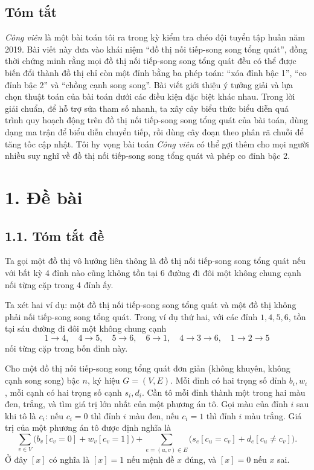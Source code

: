 \documentclass[11pt]{article}
\begin{document}
\subsection*{Tóm tắt}

\emph{Công viên} là một bài toán tôi ra trong kỳ kiểm tra chéo đội tuyển tập
huấn năm 2019. Bài viết này đưa vào khái niệm ``đồ thị nối tiếp-song song
tổng quát'', đồng thời chứng minh rằng mọi đồ thị nối tiếp-song song tổng
quát đều có thể được biến đổi thành đồ thị chỉ còn một đỉnh bằng ba phép toán:
``xóa đỉnh bậc 1'', ``co đỉnh bậc 2'' và ``chồng cạnh song song''. Bài viết
giới thiệu ý tưởng giải và lựa chọn thuật toán của bài toán dưới các điều
kiện đặc biệt khác nhau. Trong lời giải chuẩn, để hỗ trợ sửa tham số nhanh,
ta xây cây biểu thức biểu diễn quá trình quy hoạch động trên đồ thị nối
tiếp-song song tổng quát của bài toán, dùng dạng ma trận để biểu diễn chuyển
tiếp, rồi dùng cây đoạn theo phân rã chuỗi để tăng tốc cập nhật. Tôi hy vọng
bài toán \emph{Công viên} có thể gợi thêm cho mọi người nhiều suy nghĩ về đồ
thị nối tiếp-song song tổng quát và phép co đỉnh bậc 2.

\section*{1. Đề bài}

\subsection*{1.1. Tóm tắt đề}

Ta gọi một đồ thị vô hướng liên thông là đồ thị nối tiếp-song song tổng quát
nếu với bất kỳ 4 đỉnh nào cũng không tồn tại 6 đường đi đôi một không chung
cạnh nối từng cặp trong 4 đỉnh ấy.

Ta xét hai ví dụ: một đồ thị nối tiếp-song song tổng quát và một đồ thị không
phải nối tiếp-song song tổng quát. Trong ví dụ thứ hai, với các đỉnh
\(1,4,5,6\), tồn tại sáu đường đi đôi một không chung cạnh
\[
  1\to4,\quad 4\to5,\quad 5\to6,\quad 6\to1,\quad
  4\to3\to6,\quad 1\to2\to5
\]
nối từng cặp trong bốn đỉnh này.

Cho một đồ thị nối tiếp-song song tổng quát đơn giản (không khuyên, không
cạnh song song) bậc \(n\), ký hiệu \(G=(V,E)\). Mỗi đỉnh có hai trọng số đỉnh
\(b_i,w_i\), mỗi cạnh có hai trọng số cạnh \(s_i,d_i\). Cần tô mỗi đỉnh thành
một trong hai màu đen, trắng, và tìm giá trị lớn nhất của một phương án tô.
Gọi màu của đỉnh \(i\) sau khi tô là \(c_i\): nếu \(c_i=0\) thì đỉnh \(i\)
màu đen, nếu \(c_i=1\) thì đỉnh \(i\) màu trắng. Giá trị của một phương án tô
được định nghĩa là
\[
  \sum_{v\in V}\bigl(b_v[c_v=0]+w_v[c_v=1]\bigr)
  +\sum_{e=(u,v)\in E}\bigl(s_e[c_u=c_v]+d_e[c_u\ne c_v]\bigr).
\]
Ở đây \([x]\) có nghĩa là \([x]=1\) nếu mệnh đề \(x\) đúng, và \([x]=0\)
nếu \(x\) sai.
\end{document}
